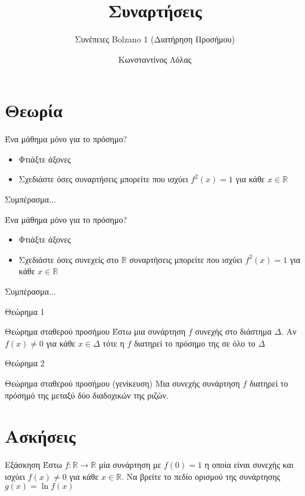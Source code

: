 \documentclass[greek]{beamer}
\title{Συναρτήσεις}
\subtitle{Συνέπειες Bolzano 1 (Διατήρηση Προσήμου)}
\author[Λόλας]{Κωνσταντίνος Λόλας}
\date{}
\begin{document}
\begin{frame}
 \titlepage
\end{frame}

\section{Θεωρία}
\begin{frame}{Ένα μάθημα μόνο για το πρόσημο?}
 \begin{itemize}
  \item Φτιάξτε άξονες \pause
  \item Σχεδιάστε όσες συναρτήσεις μπορείτε που ισχύει $f^2(x)=1$ για κάθε $x\in \mathbb{R}$ \pause
 \end{itemize}
 Συμπέρασμα...
\end{frame}

\begin{frame}{Ένα μάθημα μόνο για το πρόσημο?}
 \begin{itemize}
  \item Φτιάξτε άξονες \pause
  \item Σχεδιάστε όσες συνεχείς στο $\mathbb{R}$ συναρτήσεις μπορείτε που ισχύει $f^2(x)=1$ για κάθε $x\in \mathbb{R}$ \pause
 \end{itemize}
 Συμπέρασμα...
\end{frame}

\begin{frame}{Θεώρημα 1}
 \begin{block}{Θεώρημα σταθερού προσήμου}
  Έστω μια συνάρτηση $f$ συνεχής στο διάστημα $Δ$. Αν $f(x)\ne 0$ για κάθε $x\in Δ$ τότε η $f$ διατηρεί το πρόσημο της σε όλο το $Δ$
 \end{block}
\end{frame}

\begin{frame}{Θεώρημα 2}
 \begin{block}{Θεώρημα σταθερού προσήμου (γενίκευση)}
  Μια συνεχής συνάρτηση $f$ διατηρεί το πρόσημό της μεταξύ δύο διαδοχικών της ριζών.
 \end{block}
\end{frame}

\section{Ασκήσεις}
\begin{frame}{Εξάσκηση}
 Έστω $f:\mathbb{R}\to\mathbb{R}$ μία συνάρτηση με $f(0)=1$ η οποία είναι συνεχής και ισχύει $f(x)\ne 0$ για κάθε $x\in\mathbb{R}$. Να βρείτε το πεδίο ορισμού της συνάρτησης $g(x)=\ln f(x)$
\end{frame}
\end{document}
